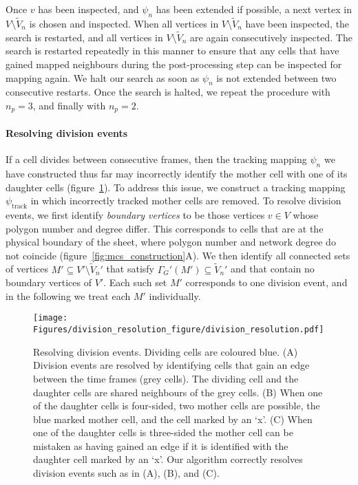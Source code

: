 \documentclass[a4paper,11pt]{article}
\begin{document}
Once $v$ has been inspected, and $\psi_{n}$ has been extended if possible, a next vertex in $V \setminus \tilde{V}_{n}$ is chosen and inspected. 
When all vertices in $V \setminus \tilde{V}_{n}$ have been inspected, the search is restarted, and all vertices in $V \setminus \tilde{V}_{n}$ are again consecutively inspected. 
The search is restarted repeatedly in this manner to ensure that any cells that have gained mapped neighbours during the post-processing step can be inspected for mapping again.
We halt our search as soon as $\psi_{n}$ is not extended between two consecutive restarts. Once the search is halted, we repeat the procedure with $n_{p} = 3$, and finally with $n_{p} = 2$. 


\paragraph{Resolving division events}

If a cell divides between consecutive frames, then the tracking mapping $\psi_{n}$ we have constructed thus far may incorrectly identify the mother cell with one of its daughter cells (figure~\ref{fig:division_resolution}). 
To address this issue, we construct a tracking mapping $\psi_\mathrm{track}$ in which incorrectly tracked mother cells are removed.
To resolve division events, we first identify \textit{boundary vertices} to be those vertices $v \in V$ whose polygon number and degree differ. 
This corresponds to cells that are at the physical boundary of the sheet, where polygon number and network degree do not coincide (figure~\ref{fig:mcs_construction}A). 
We then identify all connected sets of vertices $M' \subseteq V'\setminus \tilde{V}_{n}'$ that satisfy $\Gamma_G'(M') \subseteq \tilde{V}_{n}'$ and that contain no boundary vertices of $V'$. 
Each such set $M'$ corresponds to one division event, and in the following we treat each $M'$ individually.

\begin{figure}[t]
\centering
\texttt{[image: Figures/division\_resolution\_figure/division\_resolution.pdf]}
\caption{Resolving division events. 
Dividing cells are coloured blue. 
(A) Division events are resolved by identifying cells that gain an edge between the time frames (grey cells). 
The dividing cell and the daughter cells are shared neighbours of the grey cells. 
(B) When one of the daughter cells is four-sided, two mother cells are possible, the blue marked mother cell, and the cell marked by an `x'. 
(C) When one of the daughter cells is three-sided the mother cell can be mistaken as having gained an edge if it is identified with the daughter cell marked by an `x'. 
Our algorithm correctly resolves division events such as in (A), (B), and (C).}
\label{fig:division_resolution}
\end{figure}
\end{document}
